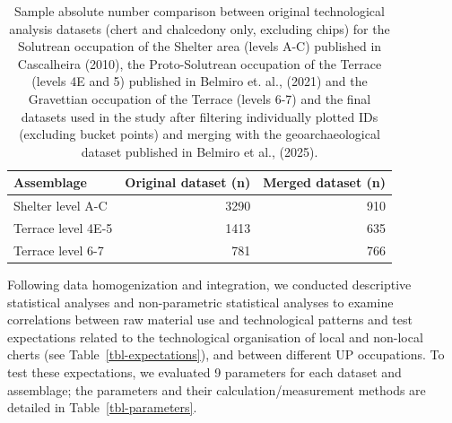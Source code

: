 \documentclass[
  a4paper,
  DIV=11,
  numbers=noendperiod]{scrreprt}
\begin{document}
\begin{longtable}[]{@{}lrr@{}}

\caption{\label{tbl-samples}Sample absolute number comparison between
original technological analysis datasets (chert and chalcedony only,
excluding chips) for the Solutrean occupation of the Shelter area
(levels A-C) published in Cascalheira (2010), the Proto-Solutrean
occupation of the Terrace (levels 4E and 5) published in Belmiro et.
al., (2021) and the Gravettian occupation of the Terrace (levels 6-7)
and the final datasets used in the study after filtering individually
plotted IDs (excluding bucket points) and merging with the
geoarchaeological dataset published in Belmiro et al., (2025).}

\tabularnewline

\toprule\noalign{}
Assemblage & Original dataset (n) & Merged dataset (n) \\
\midrule\noalign{}
\endhead
\bottomrule\noalign{}
\endlastfoot
Shelter level A-C & 3290 & 910 \\
Terrace level 4E-5 & 1413 & 635 \\
Terrace level 6-7 & 781 & 766 \\

\end{longtable}

Following data homogenization and integration, we conducted descriptive
statistical analyses and non-parametric statistical analyses to examine
correlations between raw material use and technological patterns and
test expectations related to the technological organisation of local and
non-local cherts (see Table~\ref{tbl-expectations}), and between
different UP occupations. To test these expectations, we evaluated 9
parameters for each dataset and assemblage; the parameters and their
calculation/measurement methods are detailed in
Table~\ref{tbl-parameters}.
\end{document}
